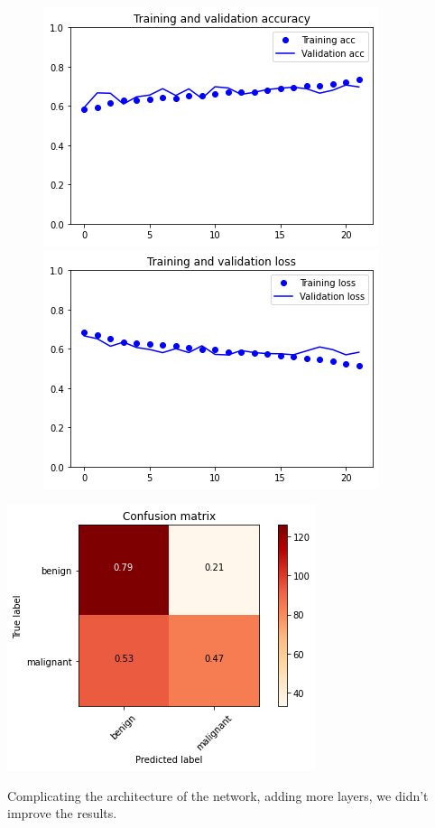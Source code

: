 \documentclass{article}
\begin{document}
\begin{figure}[h]
    \centering
    \begin{minipage}{0.45\textwidth}
        \centering
        \includegraphics[scale=0.46]{./img/scratchVal3_2.png}
    \end{minipage}\hfill
    \begin{minipage}{0.45\textwidth}
        \centering
        \includegraphics[scale=0.46]{./img/scratchLoss3_2.png}
    \end{minipage}
\end{figure}

\begin{center}
\begin{minipage}{0.45\textwidth}
        \includegraphics[scale=0.6]{./img/cmScratch3_2.png}
    \end{minipage}
\end{center}
Complicating the architecture of the network, adding more layers, we didn't improve the results.
\end{document}

